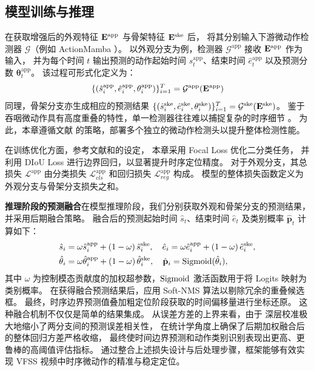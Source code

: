 \subsection{模型训练与推理}
在获取增强后的外观特征 \(\mathbf{E}^{\text{app}}\) 与骨架特征 \(\mathbf{E}^{\text{ske}}\) 后，
将其分别输入下游微动作检测器 \(\mathcal{G}\)（例如 ActionMamba \cite{chen2024video}）。
以外观分支为例，检测器 \(\mathcal{G}^{\text{app}}\) 接收 \(\mathbf{E}^{\text{app}}\) 作为输入，
并为每个时间 \(t\) 输出预测的动作起始时间 \(\hat{s}_t^{\text{app}}\)、结束时间 \(\hat{e}_t^{\text{app}}\) 以及预测分数 \(\mathbf{\theta}_t^{\text{app}}\)。
该过程可形式化定义为：
\begin{equation}\label{eq: output}
\{(\hat{s}_i^{\text{app}}, \hat{e}_i^{\text{app}}, \mathbf{\theta}_i^{\text{app}})\}_{i = 1}^T=\mathcal{G}^{\text{app}}(\mathbf{E}^{\text{app}})
\end{equation}
同理，骨架分支亦生成相应的预测结果 \(\{(\hat{s}_i^{\text{ske}}, \hat{e}_i^{\text{ske}}, \mathbf{\theta}_i^{\text{ske}})\}_{i = 1}^T=\mathcal{G}^{\text{ske}}(\mathbf{E}^{\text{ske}})\)。
鉴于吞咽微动作具有高度重叠的特性，单一检测器往往难以捕捉复杂的时序细节 \cite{ruan2023temporal}。
为此，本章遵循文献\parencite{ruan2023temporal} 的策略，部署多个独立的微动作检测头以提升整体检测性能。

在训练优化方面，参考文献\parencite{zhang2022actionformer}和\parencite{chen2024video}的设定，
本章采用 Focal Loss \cite{tian2019fcos} 优化二分类任务，
并利用 DIoU Loss \cite{rezatofighi2019generalized} 进行边界回归，以显著提升时序定位精度。
对于外观分支，其总损失 \(\mathcal{L}^\text{app}\) 由分类损失 \(\mathcal{L}_{cls}^\text{app}\) 和回归损失 \(\mathcal{L}_{reg}^\text{app}\) 构成。
模型的整体损失函数定义为外观分支与骨架分支损失之和。

\textbf{推理阶段的预测融合}\quad 在模型推理阶段，我们分别获取外观和骨架分支的预测结果，并采用后期融合策略。
融合后的预测起始时间 \(\hat{s}_t\)、结束时间 \(\hat{e}_t\) 及类别概率 \(\hat{\mathbf{p}}_t\) 计算如下：
\begin{align}\label{eq: late fusion}
\notag\hat{s}_i &= \omega \hat{s}_i^{\text{app}} + \left(1-\omega\right) \hat{s}_i^{\text{ske}},\quad
\hat{e}_i = \omega \hat{e}_i^{\text{app}} + \left(1-\omega\right) \hat{e}_i^{\text{ske}}, \\
\hat{\mathbf{\theta}}_i &= \omega \hat{\mathbf{\theta}}_i^{\text{app}} + \left(1-\omega\right) \hat{\mathbf{\theta}}_i^{\text{ske}},\quad
\hat{\mathbf{p}}_i = {\rm Sigmoid}(\hat{\mathbf{\theta}}_i),
\end{align}
其中 \(\omega \) 为控制模态贡献度的加权超参数，\({\rm Sigmoid}\) 激活函数用于将 Logits 映射为类别概率。
在获得融合预测结果后，应用 Soft-NMS \cite{bodla2017soft} 算法以剔除冗余的重叠候选框。
最终，时序边界预测值叠加粗定位阶段获取的时间偏移量进行坐标还原。
这种融合机制不仅仅是简单的结果集成。
从误差方差的上界来看，由于 \crossblockshort 深层校准极大地缩小了两分支间的预测误差相关性，
在统计学角度上确保了后期加权融合后的整体回归方差严格收缩，
最终使时间边界预测和动作类别识别表现出更高、更鲁棒的高阈值评估指标。
通过整合上述损失设计与后处理步骤，\sexyname 框架能够有效实现 VFSS 视频中时序微动作的精准与稳定定位。

